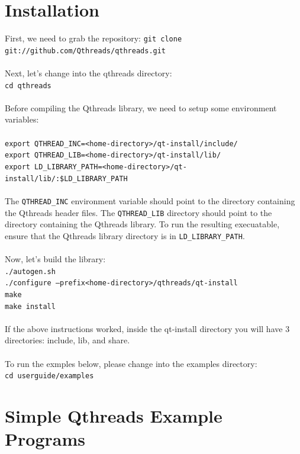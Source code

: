 \documentclass[12pt,fullpage]{article}
\begin{document}
\section{Installation}
First, we need to grab the repository:
{\footnotesize{\tt git clone git://github.com/Qthreads/qthreads.git}}
\\ \\
Next, let's change into the qthreads directory:
\\
{\footnotesize{\tt cd qthreads}}
\\ \\
Before compiling the Qthreads library, we need to setup some environment variables:
\\ \\
{\footnotesize{\tt export QTHREAD\_INC=<home-directory>/qt-install/include/}}
\\
{\footnotesize{\tt export QTHREAD\_LIB=<home-directory>/qt-install/lib/}}
\\
{\footnotesize{\tt export LD\_LIBRARY\_PATH=<home-directory>/qt-install/lib/:\$LD\_LIBRARY\_PATH}}
\\ \\
The {\tt QTHREAD\_INC} environment variable should point to the directory containing the Qthreads header files.  The {\tt QTHREAD\_LIB} directory should point to the directory containing the Qthreads library.  To run the resulting execuatable, ensure that the Qthreads library directory is in {\tt LD\_LIBRARY\_PATH}.
\\ \\
Now, let's build the library: 
\\
{\footnotesize{\tt ./autogen.sh}}
\\
{\footnotesize{\tt ./configure --prefix<home-directory>/qthreads/qt-install}}
\\
{\footnotesize{\tt make}}
\\
{\footnotesize{\tt make install}}
\\ \\
If the above instructions worked, inside the qt-install directory you will have 3 directories: include, lib, and share.
\\ \\ 
To run the exmples below, please change into the examples directory:
\\
{\footnotesize{\tt cd userguide/examples}}

\newpage
\section{Simple Qthreads Example Programs}
\end{document}
